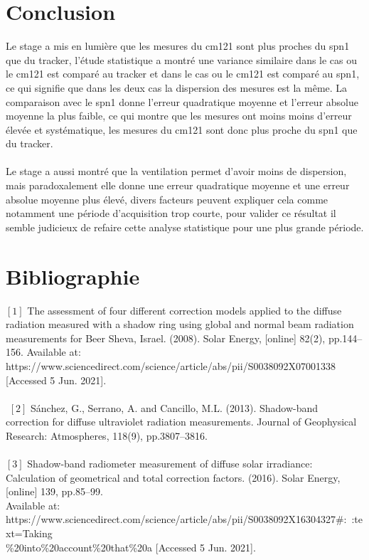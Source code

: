 \documentclass[12pt,a4paper]{article}
\begin{document}
\begin{flushleft}
\section{Conclusion}

Le stage a mis en lumière que les mesures du cm121 sont plus proches du spn1 que du tracker, l'étude statistique a montré une variance similaire dans le cas ou le cm121 est comparé au tracker et dans le cas ou le cm121 est comparé au spn1, ce qui signifie que dans les deux cas la dispersion des mesures est la même. La comparaison avec le spn1 donne l'erreur quadratique  moyenne et l'erreur absolue moyenne la plus faible, ce qui montre que les mesures ont moins moins d'erreur élevée et systématique, les mesures du cm121 sont donc plus proche du spn1 que du tracker.\\
~\\
Le stage a aussi montré que la ventilation permet d'avoir moins de dispersion, mais paradoxalement elle donne une erreur quadratique moyenne et une erreur absolue moyenne plus élevé, divers facteurs peuvent expliquer cela comme notamment une période d'acquisition trop courte, pour valider ce résultat il semble judicieux de refaire cette analyse statistique pour une plus grande période.

\newpage

\section{Bibliographie}


$[1]$ The assessment of four different correction models applied to the diffuse radiation measured with a shadow ring using global and normal beam radiation measurements for Beer Sheva, Israel. (2008). Solar Energy, [online] 82(2), pp.144–156. Available at: https://www.sciencedirect.com/science/article/abs/pii/S0038092X07001338 [Accessed 5 Jun. 2021].\\
~\\
‌
$[2]$ Sánchez, G., Serrano, A. and Cancillo, M.L. (2013). Shadow-band correction for diffuse ultraviolet radiation measurements. Journal of Geophysical Research: Atmospheres, 118(9), pp.3807–3816.\\

‌~\\
$[3]$ Shadow-band radiometer measurement of diffuse solar irradiance: Calculation of geometrical and total correction factors. (2016). Solar Energy, [online] 139, pp.85–99.\\ 
Available at: https://www.sciencedirect.com/science/article/abs/pii/S0038092X16304327\#:~:text=Taking\\\%20into\%20account\%20that\%20a [Accessed 5 Jun. 2021].\\


\end{flushleft}
\end{document}
